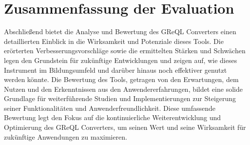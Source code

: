 \section{Zusammenfassung der Evaluation}

Abschließend bietet die Analyse und Bewertung des GReQL Converters einen detaillierten Einblick in die Wirksamkeit und
Potenziale dieses Tools. Die erörterten Verbesserungsvorschläge sowie die ermittelten Stärken und Schwächen legen den
Grundstein für zukünftige Entwicklungen und zeigen auf, wie dieses Instrument im Bildungsumfeld und darüber hinaus noch
effektiver genutzt werden könnte. Die Bewertung des Tools, getragen von den Erwartungen, dem Nutzen und den
Erkenntnissen aus den Anwendererfahrungen, bildet eine solide Grundlage für weiterführende Studien und Implementierungen
zur Steigerung seiner Funktionalitäten und Anwenderfreundlichkeit. Diese umfassende Bewertung legt den Fokus auf die
kontinuierliche Weiterentwicklung und Optimierung des GReQL Converters, um seinen Wert und seine Wirksamkeit für
zukünftige Anwendungen zu maximieren.
